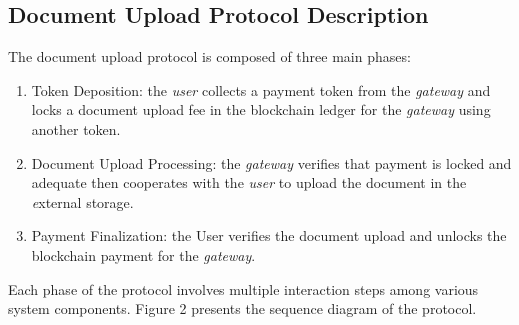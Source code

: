 \subsection{Document Upload Protocol Description}
The document upload protocol is composed of three main phases:
\begin{enumerate}
\item Token Deposition: the {\it user} collects a payment token from the {\it gateway} and locks a document upload fee in the blockchain ledger for the {\it gateway} using another token.
\item Document Upload Processing: the {\it gateway} verifies that payment is locked and adequate then cooperates with the \textit{user} to upload the document in the {\textit external storage}.
\item Payment Finalization: the User verifies the document upload and unlocks the blockchain payment for the {\it gateway}.
\end{enumerate}
Each phase of the protocol involves multiple interaction steps among various system components. Figure 2 presents the sequence diagram of the protocol.
